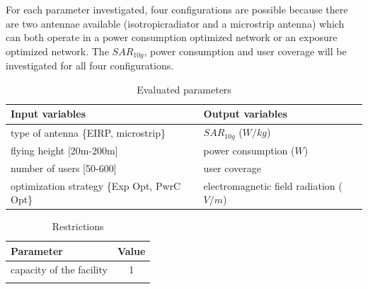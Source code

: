For each parameter investigated, four configurations are possible because there are two antennae available (\gls{isotropicradiator} and a microstrip antenna) which can both operate in a power consumption optimized network or an exposure optimized 
network. The $SAR_{10g}$, power consumption and user coverage will be investigated for all four configurations.

\begin{table}[h]
\centering
            \begin{tabular}{|l|l|}
            \hline
            \textbf{Input variables  }              & \textbf{Output variables}          \\   \hline 
            type of antenna  \{EIRP, microstrip\}               & $SAR_{10g}$ ($W/kg$)             \\ 
            flying height [20m-200m]                 & power consumption ($W$)          \\ 
            number of users  [50-600]              & user coverage            \\
            optimization strategy \{Exp Opt, PwrC Opt\}        &     electromagnetic field radiation ($V/m$)\\
            \hline
            \end{tabular}
            \caption{Evaluated parameters}
          \label{table:s2:evalpara}
\end{table}
\begin{table}[h]
\centering
        \begin{tabular}{|l|c|}
        \hline
        \textbf{Parameter}            & \textbf{Value}       \\   \hline 
        capacity of the facility          & 1        \\    
        & \\ 
        \hline
        \end{tabular}
        \caption{Restrictions}
        \label{table:S2:restrictions}
\end{table}

